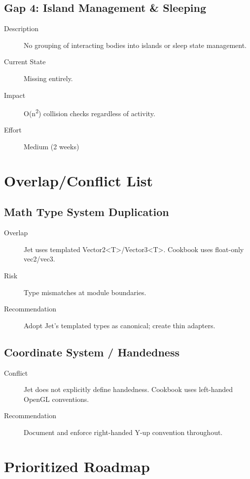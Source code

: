 \documentclass[11pt]{article}
\begin{document}
\subsection{Gap 4: Island Management \& Sleeping}

\begin{description}
\item[Description] No grouping of interacting bodies into islands or sleep state management.
\item[Current State] Missing entirely.
\item[Impact] O(n\textsuperscript{2}) collision checks regardless of activity.
\item[Effort] Medium (2 weeks)
\end{description}

\section{Overlap/Conflict List}

\subsection{Math Type System Duplication}

\begin{description}
\item[Overlap] Jet uses templated Vector2<T>/Vector3<T>. Cookbook uses float-only vec2/vec3.
\item[Risk] Type mismatches at module boundaries.
\item[Recommendation] Adopt Jet's templated types as canonical; create thin adapters.
\end{description}

\subsection{Coordinate System / Handedness}

\begin{description}
\item[Conflict] Jet does not explicitly define handedness. Cookbook uses left-handed OpenGL conventions.
\item[Recommendation] Document and enforce right-handed Y-up convention throughout.
\end{description}

\section{Prioritized Roadmap}
\end{document}
